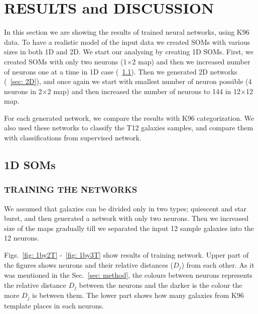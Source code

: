 \section{RESULTS and DISCUSSION}
\label{sec: result}
    In this section we are showing the results of trained neural networks, using K96 data. 
    To have a realistic model of the input data we created SOMs with various sizes in both 1D and 2D.
    We start our analysing by creating 1D SOMs. 
    First, we created SOMs with only two neurons (1$\times$2 map) and then we increased number of neurons one at a time in 1D case (~\ref{sec: 1D}).
    Then we generated 2D networks (~\ref{sec: 2D}), and once again we start with smallest number of neuron possible (4 neurons in 2$\times$2 map) and then increased the number of neurons to 144 in 12$\times$12 map.
    
    For each generated network, we compare the results with K96 categorization.
    We also used these networks to classify the T12 galaxies samples, and compare them with classifications from supervised network.
    \subsection{1D SOMs}
    \label{sec: 1D}
        \subsubsection{TRAINING THE NETWORKS}
        \label{sec: 1Dt}
            We assumed that galaxies can be divided only in two types; quiescent and star burst, and then generated a network with only two neurons.
            Then we increased size of the maps gradually till we separated the input 12 sample galaxies into the 12 neurons. 
        
            Figs.~\ref{fig: 1by2T} -~\ref{fig: 1by3T} show results of training network.
            Upper part of the figures shows neurons and their relative distances ($D_j$) from each other.
            As it was mentioned in the Sec.~\ref{sec: method}, the colours between neurons represents the relative distance $D_j$ between the neurons and the darker is the colour the more $D_j$ is between them.
            The lower part shows how many galaxies from K96 template places in each neurons. 
        
